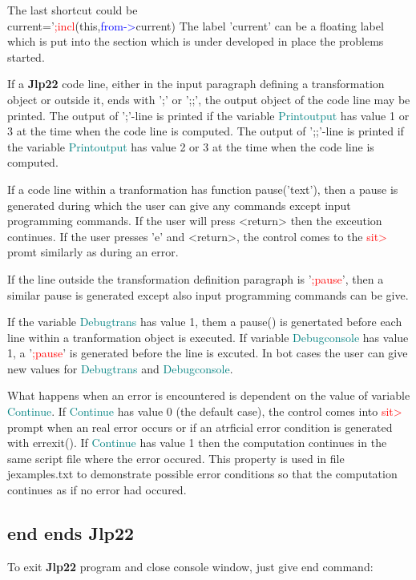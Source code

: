 {The last shortcut could be \\ 
current='\textcolor{Red}{;incl}(this,\textcolor{blue}{from->}current) 
The label 'current' can be a floating label which is put into the section which is under developed 
in place the problems started. 
 
If a \textbf{Jlp22} code line, either in the input paragraph defining a transformation object 
or outside it, ends with ';' or ';;', the output object of the code line may be printed. 
The output of ';'-line is printed if the variable \textcolor{teal}{Printoutput} has value 1 or 3 at the time when the 
code line is computed. 
The output of ';;'-line is printed if the variable \textcolor{teal}{Printoutput} has value 2 or 3 at the time when the 
code line is computed. 
 
If a code line within a tranformation has function \textcolor{VioletRed}{pause}('text'), then a pause is generated during which 
the user can give any commands except 
input programming commands. If the user will press <return> then the exceution continues. If the user 
presses 'e' and <return>, the control comes to the \textcolor{Red}{sit>} promt similarly as during an error. 
 
If the line outside the transformation definition paragraph is '\textcolor{Red}{;pause}', then 
a similar pause is generated except also input programming commands can be give. 
 
If the variable \textcolor{teal}{Debugtrans} has value 1, them a \textcolor{VioletRed}{pause}() is genertated before each line within 
a tranformation object is executed.  If variable \textcolor{teal}{Debugconsole} has value 1, 
a '\textcolor{Red}{;pause}' is generated before  the line is excuted. In bot cases the user can 
give new values for \textcolor{teal}{Debugtrans} and \textcolor{teal}{Debugconsole}. 
 
What happens when an error is encountered is dependent on the value of variable \textcolor{teal}{Continue}. If \textcolor{teal}{Continue} has 
value 0 (the default case), the control comes into \textcolor{Red}{sit>} prompt when an real error occurs or if an atrficial 
error condition is generated with \textcolor{VioletRed}{errexit}(). If \textcolor{teal}{Continue} has value 1 then the computation continues in 
the same script file where the error occured. This property is used in file jexamples.txt to demonstrate 
possible error conditions so that the computation continues as if no error had occured. 
 
 
\subsection{end ends \textbf{Jlp22}} 
\label{exit} 
To exit \textbf{Jlp22} program and close console window, just give end command: 
 
}
